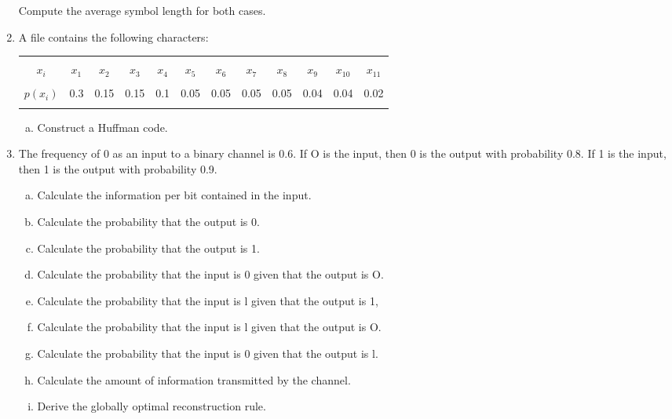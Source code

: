 \documentclass[a4paper,12pt]{article}
\begin{document}
\begin{enumerate}
Compute the average symbol length for both cases.


\item A file contains the following characters:\\[-0.1cm]
\begin{center}
	\begin{tabular}{|c|ccccccccccc|}
		\hline
		&&&&&&&&&&& \\[-0.4cm]
		$x_i$     & $x_1$ & $x_2$ & $x_3$ & $x_4$ & $x_5$ & $x_6$ & $x_7$  & $x_8$ & $x_9$  & $x_{10}$ & $x_{11}$ \\[0.1cm]
		\hline
		&&&&&&&&&&& \\[-0.4cm]
		$p(x_i)$  & 0.3 & 0.15 & 0.15 & 0.1 & 0.05 & 0.05 & 0.05 & 0.05 & 0.04 & 0.04 & 0.02 \\[0.1cm]
		\hline
		\multicolumn{12}{c}{}\\[-0.2cm]
	\end{tabular}
\end{center}

\begin{enumerate}[(a)]
	\item Construct a Huffman code.
\end{enumerate}


\item The frequency of 0 as an input to a binary channel is 0.6. If O is the
input, then 0 is the output with probability 0.8. If 1 is the input, then 1 is the output with probability 0.9.
\begin{enumerate}[(a)]
	\item Calculate the information per bit contained in the input.
	\item Calculate the probability that the output is 0.
	\item Calculate the probability that the output is 1.
	\item Calculate the probability that the input is 0 given that the
	output is O.
	\item Calculate the probability that the input is l given that
	the output is 1,
	\item Calculate the probability that the input is l given that
	the output is O.
	\item Calculate the probability that the input is 0 given that
	the output is l.
	\item Calculate the amount of information transmitted by the channel.
	\item Derive the globally optimal reconstruction rule.
\end{enumerate}
\end{enumerate}
\end{document}
